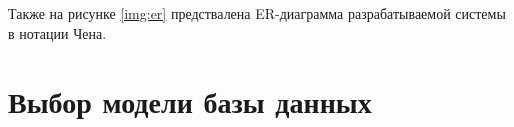 


Также на рисунке \ref{img:er} предствалена ER-диаграмма \cite{er} разрабатываемой системы в нотации Чена.



\section{Выбор модели базы данных}

